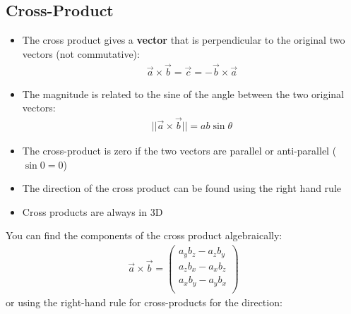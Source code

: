 \documentclass[aspectratio=169,
hyperref={colorlinks,urlcolor=blue}
]{beamer}
\begin{document}
\subsection{Cross-Product}
\label{subsec:crossproduct}
{
\scriptsize
\begin{itemize}
\item The cross product gives a \textbf{vector} that is perpendicular to the original two vectors (not commutative):
\begin{align*}
\vec a \times \vec b = \vec c = -\vec b \times \vec a
\end{align*}
\item The magnitude is related to the sine of the angle between the two original vectors:
\begin{align*}
||\vec a \times \vec b ||= ab\sin\theta
\end{align*}
\item The cross-product is zero if the two vectors are parallel or anti-parallel ($\sin 0 =0$)
\item The direction of the cross product can be found using the right hand rule
\item Cross products are always in 3D
\end{itemize}
}
{
\scriptsize
You can find the components of the cross product algebraically:
\begin{align*}
\vec a \times \vec b =\begin{pmatrix}
           a_yb_z - a_z b_y\\
           a_zb_x - a_x b_z\\
           a_xb_y - a_y b_x\\
         \end{pmatrix}
\end{align*}
or using the right-hand rule for cross-products for the direction:
}

\end{document}
